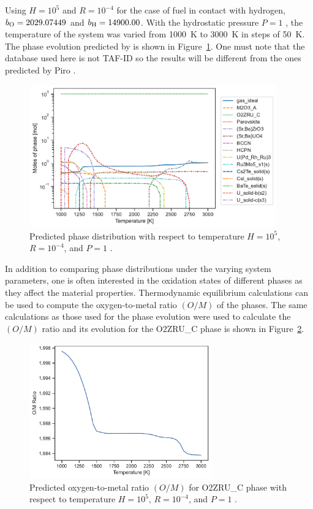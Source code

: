 Using $H = 10^5$ and $R = 10^{-4}$ for the case of fuel in contact with hydrogen, $b_{\ce{O}} = 2029.07449$ and $b_{\ce{H}} = 14900.00$. With the hydrostatic pressure $P = 1$ \si{\atmosphere}, the temperature of the system was varied from \SI{1000}{\kelvin} to \SI{3000}{\kelvin} in steps of \SI{50}{\kelvin}. The phase evolution predicted by {\GEM} is shown in Figure~\ref{fig:candu_phase}. One must note that the database used here is not TAF-ID so the results will be different from the ones predicted by Piro \cite{Piro:2022aa}.
\begin{figure}[ht]
         \centering
         \includegraphics[width=0.95\textwidth]{figures/chapter-7/Candu_moles.pdf}
         \caption{Predicted phase distribution with respect to temperature $H = 10^5$, $R = 10^{−4}$, and $P = 1$ \si{\atmosphere}.}
     \label{fig:candu_phase}
\end{figure}

In addition to comparing phase distributions under the varying system parameters, one is often interested in the oxidation states of different phases as they affect the material properties. Thermodynamic equilibrium calculations can be used to compute the oxygen-to-metal ratio $\left(O/M\right)$ of the phases. The same calculations as those used for the phase evolution were used to calculate the $\left(O/M\right)$ ratio and its evolution for the O2ZRU\_C phase is shown in Figure~\ref{fig:candu_om}.
\begin{figure}[htb]
         \centering
         \includegraphics[width=0.7\textwidth]{figures/chapter-7/Candu_OM.pdf}
         \caption{Predicted oxygen-to-metal ratio $\left(O/M\right)$ for O2ZRU\_C phase with respect to temperature $H = 10^5$, $R = 10^{−4}$, and $P = 1$ \si{\atmosphere}.}
     \label{fig:candu_om}
\end{figure}

